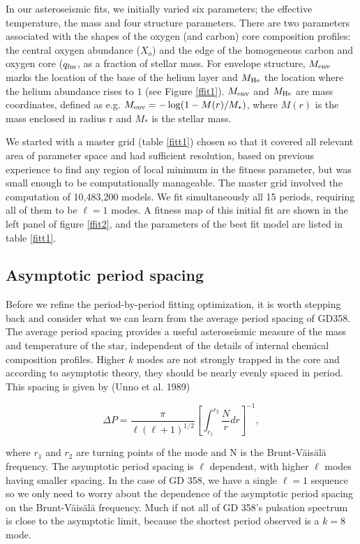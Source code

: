 \documentclass[12pt,preprint]{aastex}
\newcommand{\bvf}{Brunt-V\"ais\"al\"a }
\begin{document}
In our asteroseismic fits, we initially varied six parameters; the effective temperature, 
the mass and four structure parameters. There are two parameters associated with the shapes 
of the oxygen (and carbon) core composition profiles: the central oxygen abundance ($X_o$) and 
the edge of the homogeneous carbon and oxygen core ($q_{\rm fm}$, as a fraction of stellar mass. 
For envelope structure, $M_{\rm env}$ marks the location of the base of the helium layer 
and $M_{\rm He}$ the location where the helium abundance rises to $1$ (see Figure \ref{ffit1}). 
$M_{\rm env}$ and $M_{\rm He}$ are mass coordinates, defined as e.g. 
$M_{\rm env} = -\log(1 - M(r)/M_*)$, where $M(r)$ is the mass enclosed in radius r and 
$M_*$ is the stellar mass. 



We started with a master grid (table \ref{fitt1}) chosen so that it covered all relevant 
area of parameter space and had sufficient resolution, based on previous experience 
\citep{Bischoff-Kim11a,Bischoff-Kim14} to find any region of local minimum in the fitness parameter, 
but was small enough to be computationally manageable. The master grid involved the computation 
of 10,483,200 models. We fit simultaneously all 15 periods, requiring all of them to be $\ell=1$ 
modes. A fitness map of this initial fit are shown in the left panel of figure \ref{ffit2}, and the parameters of the best fit model are listed in table \ref{fitt1}.

\subsection{Asymptotic period spacing}
\label{periodspacing}

Before we refine the period-by-period fitting optimization, it is worth stepping back and consider 
what we can learn from the average period spacing of GD358. The average period spacing provides a 
useful asteroseismic measure of the mass and temperature of the star, independent of the details of 
internal chemical composition profiles. Higher $k$ modes are not strongly trapped in the core and 
according to asymptotic theory, they should be nearly evenly spaced in period. This spacing is 
given by (Unno et al. 1989)

\begin{equation}
\label{fiteq2}
\Delta P = \frac{\pi}{\ell(\ell + 1)^{1/2}}\left[\int_{r_1}^{r_2}\frac{N}{r}dr\right]^{-1},
\end{equation}

\noindent
where $r_1$ and $r_2$ are turning points of the mode and N is the Brunt-V\"{a}is\"{a}l\"{a} frequency. 
The asymptotic period spacing is $\ell$ dependent, with higher $\ell$ modes having smaller spacing. 
In the case of GD 358, we have a single $\ell=1$ sequence so we only need to worry about the dependence 
of the asymptotic period spacing on the \bvf frequency. Much if not all of GD 358's pulsation 
spectrum is close to the asymptotic limit, because the shortest period observed is a $k=8$ mode.
\end{document}
